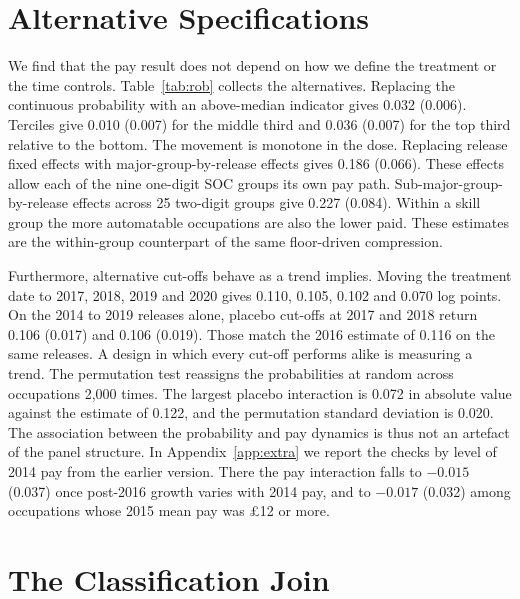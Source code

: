 \documentclass[12pt,leqno]{article}
\begin{document}
\section{Alternative Specifications}\label{sec:sens}

We find that the pay result does not depend on how we define the treatment or the time controls. Table~\ref{tab:rob} collects the alternatives. Replacing the continuous probability with an above-median indicator gives 0.032 (0.006). Terciles give 0.010 (0.007) for the middle third and 0.036 (0.007) for the top third relative to the bottom. The movement is monotone in the dose. Replacing release fixed effects with major-group-by-release effects gives 0.186 (0.066). These effects allow each of the nine one-digit SOC groups its own pay path. Sub-major-group-by-release effects across 25 two-digit groups give 0.227 (0.084). Within a skill group the more automatable occupations are also the lower paid. These estimates are the within-group counterpart of the same floor-driven compression.



Furthermore, alternative cut-offs behave as a trend implies. Moving the treatment date to 2017, 2018, 2019 and 2020 gives 0.110, 0.105, 0.102 and 0.070 log points. On the 2014 to 2019 releases alone, placebo cut-offs at 2017 and 2018 return 0.106 (0.017) and 0.106 (0.019). Those match the 2016 estimate of 0.116 on the same releases. A design in which every cut-off performs alike is measuring a trend. The permutation test reassigns the probabilities at random across occupations 2,000 times. The largest placebo interaction is 0.072 in absolute value against the estimate of 0.122, and the permutation standard deviation is 0.020. The association between the probability and pay dynamics is thus not an artefact of the panel structure. In Appendix~\ref{app:extra} we report the checks by level of 2014 pay from the earlier version. There the pay interaction falls to $-0.015$ (0.037) once post-2016 growth varies with 2014 pay, and to $-0.017$ (0.032) among occupations whose 2015 mean pay was \pounds 12 or more.

\section{The Classification Join}\label{sec:soc}
\end{document}
